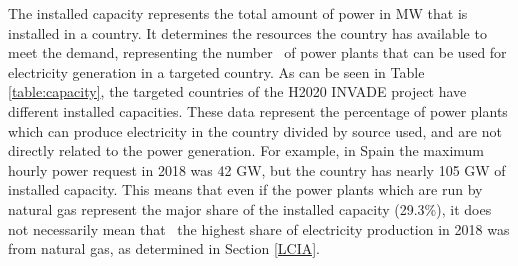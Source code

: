 {The installed capacity represents the total amount of power in MW that is installed in a country. It determines the  resources the country has available to meet the demand, representing the {number}%
~of power plants that can be used for electricity generation in a targeted country. 
As can be seen in  Table \ref{table:capacity}, the targeted countries of the H2020 INVADE project have different  installed capacities. These data represent the percentage of power plants which can produce electricity in the country divided by source used, and are not directly related to the power generation. For example, in Spain the maximum hourly power request in 2018 was 42 GW, but the country has nearly 105 GW of installed capacity. This means that even if the power plants which are run by natural gas represent the major share of the installed capacity (29.3\%), it does not necessarily{ mean that}%
~the highest share of electricity production in 2018 was from natural gas, as determined in Section \ref{LCIA}.

}
